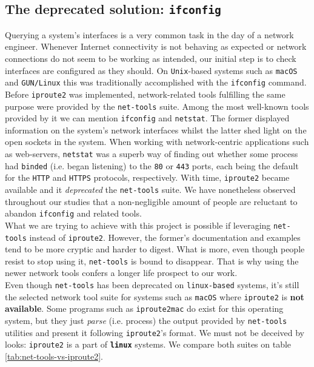         \subsection{The deprecated solution: \texttt{ifconfig}}
            Querying a system's interfaces is a very common task in the day of a network engineer. Whenever Internet connectivity is not behaving as expected or network connections do not seem to be working as intended, our initial step is to check interfaces are configured as they should. On \texttt{Unix}-based systems such as \texttt{macOS} and \texttt{GUN/Linux} this was traditionally accomplished with the \texttt{ifconfig} command. Before \texttt{iproute2} was implemented, network-related tools fulfilling the same purpose were provided by the \texttt{net-tools} suite. Among the most well-known tools provided by it we can mention \texttt{ifconfig} and \texttt{netstat}. The former displayed information on the system's network interfaces whilst the latter shed light on the open sockets in the system. When working with network-centric applications such as web-servers, \texttt{netstat} was a superb way of finding out whether some process had \texttt{binded} (i.e. began listening) to the \texttt{80} or \texttt{443} ports, each being the default for the \texttt{HTTP} and \texttt{HTTPS} protocols, respectively. With time, \texttt{iproute2} became available and it \textit{deprecated} the \texttt{net-tools} suite. We have nonetheless observed throughout our studies that a non-negligible amount of people are reluctant to abandon \texttt{ifconfig} and related tools.\\

            What we are trying to achieve with this project is possible if leveraging \texttt{net-tools} instead of \texttt{iproute2}. However, the former's documentation and examples tend to be more cryptic and harder to digest. What is more, even though people resist to stop using it, \texttt{net-tools} is bound to disappear. That is why using the newer network tools confers a longer life prospect to our work.\\

            Even though \texttt{net-tools} has been deprecated on \texttt{linux-based} systems, it's still the selected network tool suite for systems such as \texttt{macOS} where \texttt{iproute2} is \textbf{not available}. Some programs such as \texttt{iproute2mac} do exist for this operating system, but they just \textit{parse} (i.e. process) the output provided by \texttt{net-tools} utilities and present it following \texttt{iproute2}'s format. We must not be deceived by looks: \texttt{iproute2} is a part of \textbf{\texttt{linux}} systems. We compare both suites on table \ref{tab:net-tools-vs-iproute2}.\\

